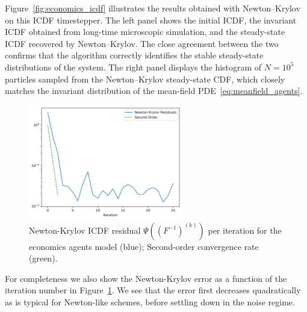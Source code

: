 \documentclass{article}
\begin{document}
Figure~\ref{fig:economics_icdf} illustrates the results obtained with Newton–Krylov on this ICDF timestepper. The left panel shows the initial ICDF, the invariant ICDF obtained from long-time microscopic simulation, and the steady-state ICDF recovered by Newton–Krylov. The close agreement between the two confirms that the algorithm correctly identifies the stable steady-state distributions of the system. The right panel displays the histogram of $N = 10^5$ particles sampled from the Newton–Krylov steady-state CDF, which closely matches the invariant distribution of the mean-field PDE~\eqref{eq:meanfield_agents}. 
\begin{figure}[h]
    \centering
    \includegraphics[width=0.6\textwidth]{figures/EconomicsICDFLosses.png}
    \caption{Newton-Krylov ICDF residual $\Psi\left((F^{-1})^{(k)}\right)$ per iteration for the economics agents model (blue); Second-order convergence rate (green). }
    \label{fig:economics_icdf_losses}
\end{figure}
For completeness we also show the Newton-Krylov error as a function of the iteration number in Figure~\ref{fig:economics_icdf_losses}. We see that the error first decreases quadratically as is typical for Newton-like schemes, before settling down in the noise regime.
\end{document}
